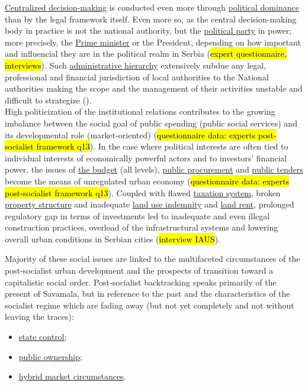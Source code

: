 \documentclass[11pt]{report}
\begin{document}
\begin{itemize}
\underline{Centralized decision-making} is conducted even more through \underline{political dominance} than by the legal framework itself.
Even more so, as the central decision-making body in practice is not the national authority, but the  \underline{political party} in power;
more precisely, the  \underline{Prime minister} or the President, depending on how important and influencial they are in the political realm in Serbia (\hl{expert questionnaire, interviews}).
Such \underline{administrative hierarchy} extensively subdue any legal, professional and financial jurisdiction of local authorities to the National authorities making the scope and the management of their activities unstable and difficult to strategize (\cite{Novi evropski regionalizam 2}).
\\
High politicization of the institutional relations contributes to the growing imbalance between the social goal of public spending (public social services) and its developmental role (market-oriented) (\hl{questionnaire data: experts post-socialist framework q13}).
In the case where political interests are often tied to individual interests of economically powerful actors and to investors' financial power, the issues of \underline{the budget} (all levels), \underline{public procurement} and \underline{public tenders} become the means of unregulated urban economy (\hl{questionnaire data: experts post-socialist framework q13}).
Coupled with flawed \underline{taxation system}, broken \underline{property structure} and inadequate \underline{land use indemnity} and \underline{land rent}, prolonged regulatory gap in terms of investments led to inadequate and even illegal construction practices, overload of the infrastructural systems and lowering overall urban conditions in Serbian cities (\hl{interview IAUS}).

Majority of these social issues are linked to the multifaceted circumstances of the post-socialist urban development and the prospects of transition toward a capitalistic social order.
Post-socialist backtracking speaks primarily of the present of Savamala, but in reference to the past and the characteristics of the socialist regime which are fading away (but not yet completely and not without leaving the traces):

\begin{itemize}
\item \underline{state control};
\item \underline{public ownership};
\item \underline{hybrid market circumstances}.
\end{itemize}


\end{itemize}
\end{document}
